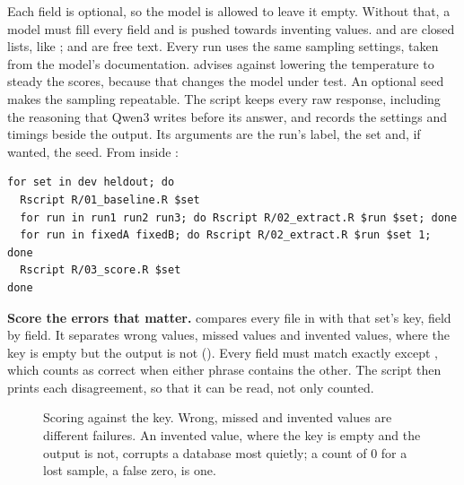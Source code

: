Each field is optional, so the model is allowed to leave it empty. Without
that, a model must fill every field and is pushed towards inventing values.
 and  are closed lists, like
;  and  are free text. Every run
uses the same sampling settings, taken from the model's documentation.
\textcite{miller2024errorbars} advises against lowering the temperature to
steady the scores, because that changes the model under test. An optional seed
makes the sampling repeatable. The script keeps every raw response, including
the reasoning that Qwen3 writes before its answer, and records the settings and
timings beside the output. Its arguments are the run's label, the set and, if
wanted, the seed. From inside :

\begin{lstlisting}[style=shell,caption={Baseline, three free runs, two seeded runs and a score, for each set}]
for set in dev heldout; do
  Rscript R/01_baseline.R $set
  for run in run1 run2 run3; do Rscript R/02_extract.R $run $set; done
  for run in fixedA fixedB; do Rscript R/02_extract.R $run $set 1; done
  Rscript R/03_score.R $set
done
\end{lstlisting}

\textbf{Score the errors that matter.}  compares every file
in  with that set's key, field by field. It separates
wrong values, missed values and invented values, where the key is empty but the
output is not (). Every field must match exactly except
, which counts as correct when either phrase contains the other.
The script then prints each disagreement, so that it can be read, not only
counted.

\begin{figure}[htbp]
\centering
{}
\caption{Scoring against the key. Wrong, missed and invented values are
different failures. An invented value, where the key is empty and the output
is not, corrupts a database most quietly; a count of 0 for a lost sample, a
false zero, is one.}
\label{fig:scoring}
\end{figure}

